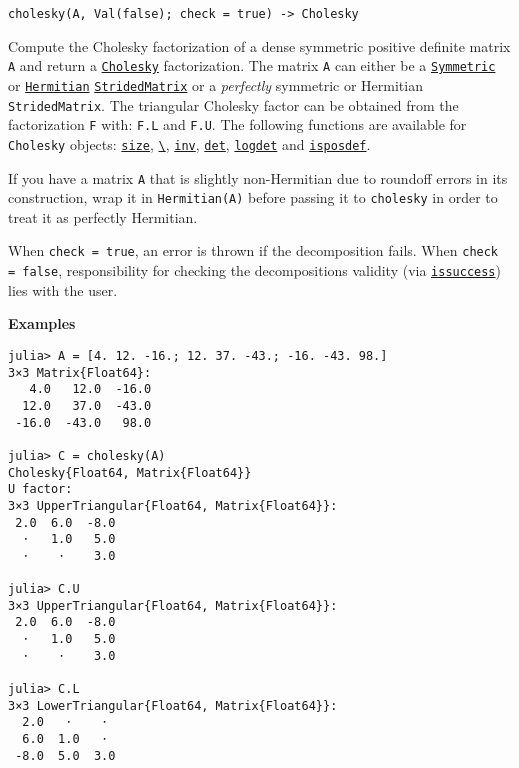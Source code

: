 \begin{adjustwidth}{2em}{0pt}


\begin{verbatim}
cholesky(A, Val(false); check = true) -> Cholesky
\end{verbatim}

Compute the Cholesky factorization of a dense symmetric positive definite matrix \texttt{A} and return a \hyperlink{17457903574632305101}{\texttt{Cholesky}} factorization. The matrix \texttt{A} can either be a \hyperlink{17683454167504168761}{\texttt{Symmetric}} or \hyperlink{938713992181310063}{\texttt{Hermitian}} \hyperlink{3855703768476610836}{\texttt{StridedMatrix}} or a \emph{perfectly} symmetric or Hermitian \texttt{StridedMatrix}. The triangular Cholesky factor can be obtained from the factorization \texttt{F} with: \texttt{F.L} and \texttt{F.U}. The following functions are available for \texttt{Cholesky} objects: \hyperlink{17888996102305087038}{\texttt{size}}, \hyperlink{2092789550033334797}{\texttt{{\textbackslash}}}, \hyperlink{13336866048543706848}{\texttt{inv}}, \hyperlink{16543378577000914469}{\texttt{det}}, \hyperlink{12765142073947245963}{\texttt{logdet}} and \hyperlink{13841568437070319804}{\texttt{isposdef}}.

If you have a matrix \texttt{A} that is slightly non-Hermitian due to roundoff errors in its construction, wrap it in \texttt{Hermitian(A)} before passing it to \texttt{cholesky} in order to treat it as perfectly Hermitian.

When \texttt{check = true}, an error is thrown if the decomposition fails. When \texttt{check = false}, responsibility for checking the decomposition{\textquotesingle}s validity (via \hyperlink{10694198281534172656}{\texttt{issuccess}}) lies with the user.

\textbf{Examples}


\begin{verbatim}
julia> A = [4. 12. -16.; 12. 37. -43.; -16. -43. 98.]
3×3 Matrix{Float64}:
   4.0   12.0  -16.0
  12.0   37.0  -43.0
 -16.0  -43.0   98.0

julia> C = cholesky(A)
Cholesky{Float64, Matrix{Float64}}
U factor:
3×3 UpperTriangular{Float64, Matrix{Float64}}:
 2.0  6.0  -8.0
  ⋅   1.0   5.0
  ⋅    ⋅    3.0

julia> C.U
3×3 UpperTriangular{Float64, Matrix{Float64}}:
 2.0  6.0  -8.0
  ⋅   1.0   5.0
  ⋅    ⋅    3.0

julia> C.L
3×3 LowerTriangular{Float64, Matrix{Float64}}:
  2.0   ⋅    ⋅
  6.0  1.0   ⋅
 -8.0  5.0  3.0


\end{verbatim}
\end{adjustwidth}
